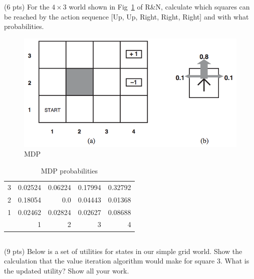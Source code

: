 \documentclass[paper=a4, fontsize=11pt]{scrartcl} %
\begin{document}
\section{}

\subsection{}
\begin{fancyquotes}
  (6 pts) For the $4\times3$ world shown in Fig~\ref{fig:mdp} of R\&N,
  calculate which squares can be reached by the action sequence [Up,
  Up, Right, Right, Right] and with what probabilities.
\end{fancyquotes}

\begin{figure}[hp]
  \centering
  \includegraphics[width=\textwidth]{mdp.png}
  \caption{MDP}
\label{fig:mdp}
\end{figure}

\begin{table}[hp]
  \centering
  \begin{tabular}[hp]{crrrr}
    3 & 0.02524 & 0.06224 & 0.17994 & 0.32792 \\
    2 & 0.18054 & 0.0 & 0.04443 & 0.01368 \\
    1 & 0.02462 & 0.02824 & 0.02627 & 0.08688 \\
    & 1 & 2 & 3 & 4
  \end{tabular}
  \caption{MDP probabilities}
\label{tab:mdp}
\end{table}

\pagebreak

\subsection{}
\begin{fancyquotes}
  (9 pts) Below is a set of utilities for states in our simple grid
  world. Show the calculation that the value iteration algorithm would
  make for square $3$. What is the updated utility? Show all your
  work.
\end{fancyquotes}
\end{document}
